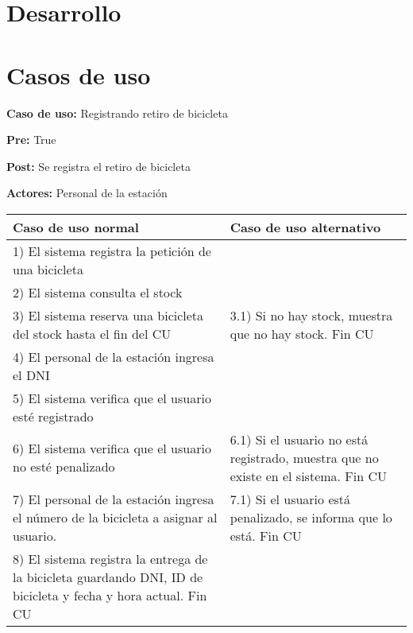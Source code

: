 \documentclass[a4paper, 10pt, twoside]{article}
\begin{document}
\vspace{2cm}






\section{Desarrollo}




\section{Casos de uso}

\textbf{Caso de uso:} Registrando retiro de bicicleta

\textbf{Pre:} True

\textbf{Post:} Se registra el retiro de bicicleta

\textbf{Actores:} Personal de la estación
\\

\begin{tabular}{| p{7cm} | p{7cm} |}
	\hline
	Caso de uso normal & Caso de uso alternativo \\ \hline
	1) El sistema registra la petición de una bicicleta &  \\ \hline
	2) El sistema consulta el stock & \\ \hline
	3) El sistema reserva una bicicleta del stock hasta el fin del CU & 3.1) Si no hay stock, muestra que no hay stock. Fin CU \\ \hline
	4) El personal de la estación ingresa el DNI & \\ \hline
	5) El sistema verifica que el usuario esté registrado & \\ \hline
	6) El sistema verifica que el usuario no esté penalizado & 6.1) Si el usuario no está registrado, muestra que no existe en el sistema. Fin CU \\ \hline
	7) El personal de la estación ingresa el número de la bicicleta a asignar al usuario. & 7.1) Si el usuario está penalizado, se informa que lo está. Fin CU \\ \hline
	8) El sistema registra la entrega de la bicicleta guardando DNI, ID de bicicleta y fecha y hora actual. Fin CU & \\
	\hline
\end{tabular}
\end{document}
